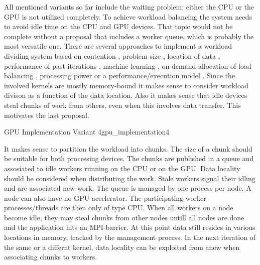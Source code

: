 \documentclass{article}
\theoremstyle{plain} %
\theoremstyle{convention} %
\theoremstyle{remark} %
\numberwithin{equation}{section}
\begin{document}
All mentioned variants so far include the waiting problem; either the CPU or the GPU is not utilized completely. To achieve workload balancing the system needs to avoid idle time on the CPU and GPU devices. That topic would not be complete without a proposal that includes a worker queue, which is probably the most versatile one. There are several approaches to implement a workload dividing system based on contention \cite{gregg2010}, problem size \cite{ding2009}, location of data \cite{becchi2010,augonnet2011}, performance of past iterations \cite{li2011,choi2013,bernabe2013,belviranli2013}, machine learning \cite{grewe2011}, on-demand allocation of load balancing \cite{agulleiro2012,teodoro2012}, processing power \cite{lu2012,hawick2013} or a performance/execution model \cite{ogata2008,augonnet2011}. Since the involved kernels are mostly memory-bound it makes sense to consider workload divison as a function of the data location. Also it makes sense that idle devices steal chunks of work from others, even when this involves data transfer. This motivates the last proposal.

\begin{proposal}{GPU Implementation Variant 4}{gpu_implementation4} %

It makes sense to partition the workload into chunks. The size of a chunk should be suitable for both processing devices. The chunks are published in a queue and assosiated to idle workers running on the CPU or on the GPU. Data locality should be considered when distributing the work. Stale workers signal their idling and are associated new work. The queue is managed by one process per node. A node can also have no GPU accelerator. The participating worker processes/threads are then only of type CPU. When all workers on a node become idle, they may steal chunks from other nodes untill all nodes are done and the application hits an MPI-barrier. At this point data still resides in various locations in memory, tracked by the management process. In the next iteration of the same or a differnt kernel, data locality can be exploited from anew when associating chunks to workers.

\end{proposal}
\end{document}
